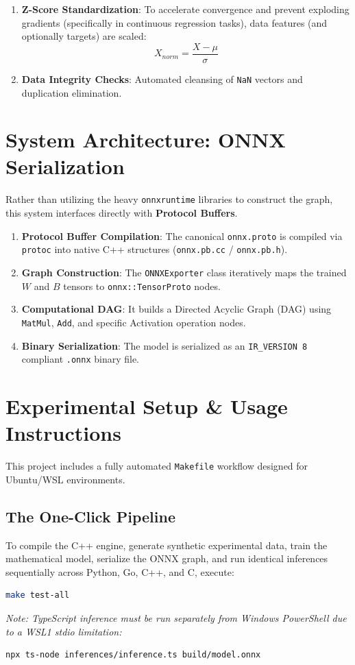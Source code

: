 \documentclass[11pt, a4paper]{article}
\begin{document}
\begin{enumerate}
    \item \textbf{Z-Score Standardization}: 
    To accelerate convergence and prevent exploding gradients (specifically in continuous regression tasks), data features (and optionally targets) are scaled:
    \begin{equation}
    X_{norm} = \frac{X - \mu}{\sigma}
    \end{equation}
    \item \textbf{Data Integrity Checks}: Automated cleansing of \texttt{NaN} vectors and duplication elimination.
\end{enumerate}

\section{System Architecture: ONNX Serialization}
Rather than utilizing the heavy \texttt{onnxruntime} libraries to construct the graph, this system interfaces directly with \textbf{Protocol Buffers}. 

\begin{enumerate}
    \item \textbf{Protocol Buffer Compilation}: The canonical \texttt{onnx.proto} is compiled via \texttt{protoc} into native C++ structures (\texttt{onnx.pb.cc} / \texttt{onnx.pb.h}).
    \item \textbf{Graph Construction}: The \texttt{ONNXExporter} class iteratively maps the trained $W$ and $B$ tensors to \texttt{onnx::TensorProto} nodes.
    \item \textbf{Computational DAG}: It builds a Directed Acyclic Graph (DAG) using \texttt{MatMul}, \texttt{Add}, and specific Activation operation nodes.
    \item \textbf{Binary Serialization}: The model is serialized as an \texttt{IR\_VERSION 8} compliant \texttt{.onnx} binary file.
\end{enumerate}

\section{Experimental Setup \& Usage Instructions}

This project includes a fully automated \texttt{Makefile} workflow designed for Ubuntu/WSL environments.

\subsection{The One-Click Pipeline}
To compile the C++ engine, generate synthetic experimental data, train the mathematical model, serialize the ONNX graph, and run identical inferences sequentially across Python, Go, C++, and C, execute:
\begin{lstlisting}[language=bash]
make test-all
\end{lstlisting}
\textit{Note: TypeScript inference must be run separately from Windows PowerShell due to a WSL1 stdio limitation:}
\begin{lstlisting}[language=bash]
npx ts-node inferences/inference.ts build/model.onnx
\end{lstlisting}
\end{document}
